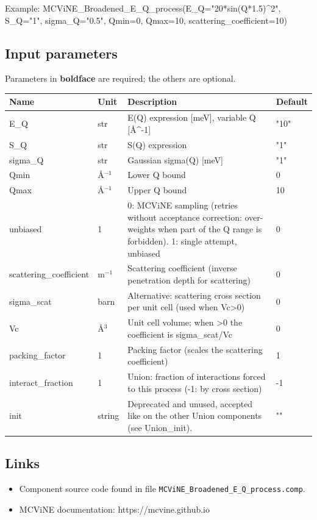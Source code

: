 Example: MCViNE\_Broadened\_E\_Q\_process(E\_Q="20*sin(Q*1.5)\textasciicircum{}2", S\_Q="1", sigma\_Q="0.5", Qmin=0, Qmax=10, scattering\_coefficient=10)

\subsection*{Input parameters}
Parameters in \textbf{boldface} are required; the others are optional.

\begin{longtable}{p{}p{}p{}p{}}
\toprule
\textbf{Name} & \textbf{Unit} & \textbf{Description} & \textbf{Default} \\
\midrule
\endhead
E\_Q & str & E(Q) expression [meV], variable Q [\AA{}\textasciicircum{}-1] & "10" \\
S\_Q & str & S(Q) expression & "1" \\
sigma\_Q & str & Gaussian sigma(Q) [meV] & "1" \\
Qmin & \AA{}$^{-1}$ & Lower Q bound & 0 \\
Qmax & \AA{}$^{-1}$ & Upper Q bound & 10 \\
unbiased & 1 & 0: MCViNE sampling (retries without acceptance correction: over-weights when part of the Q range is forbidden). 1: single attempt, unbiased & 0 \\
scattering\_coefficient & m$^{-1}$ & Scattering coefficient (inverse penetration depth for scattering) & 0 \\
sigma\_scat & barn & Alternative: scattering cross section per unit cell (used when Vc\textgreater{}0) & 0 \\
Vc & \AA{}$^{3}$ & Unit cell volume; when \textgreater{}0 the coefficient is sigma\_scat/Vc & 0 \\
packing\_factor & 1 & Packing factor (scales the scattering coefficient) & 1 \\
interact\_fraction & 1 & Union: fraction of interactions forced to this process (-1: by cross section) & -1 \\
init & string & Deprecated and unused, accepted like on the other Union components (see Union\_init). & "" \\
\bottomrule
\end{longtable}

\subsection*{Links}
\begin{itemize}
  \item Component source code found in file \texttt{MCViNE\_Broadened\_E\_Q\_process.comp}.
  \item MCViNE documentation: https://mcvine.github.io
\end{itemize}
